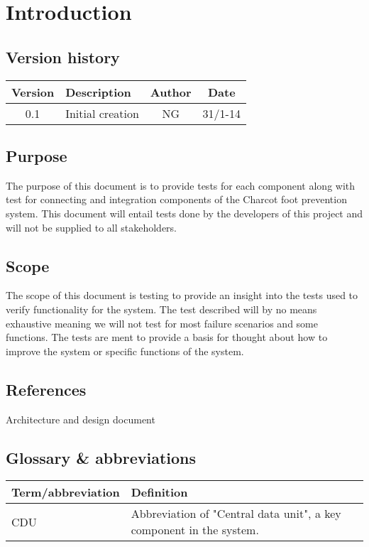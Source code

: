 \chapter{Introduction}
\section{Version history}
\begin{table}[H]
\begin{tabular}{|c|p{9cm}|c|c|}
\hline
Version & Description & Author & Date\\ \hline
0.1 & Initial creation & NG & 31/1-14 \\
\hline
\end{tabular}
\end{table}

\section{Purpose}
The purpose of this document is to provide tests for each component along with test for connecting and integration components of the Charcot foot prevention system. This document will entail tests done by the developers of this project and will not be supplied to all stakeholders.

\section{Scope}
The scope of this document is testing to provide an insight into the tests used to verify functionality for the system. The test described will by no means exhaustive meaning we will not test for most failure scenarios and some functions. The tests are ment to provide a basis for thought about how to improve the system or specific functions of the system.

\section{References}
Architecture and design document

\section{Glossary \& abbreviations}
\begin{table}[H]
\centering
\begin{tabular}{|p{4cm}|p{7cm}|}
\hline
Term/abbreviation & Definition\\ \hline
CDU & Abbreviation of "Central data unit", a key component in the system. \\ \hline
\end{tabular}
\end{table}
